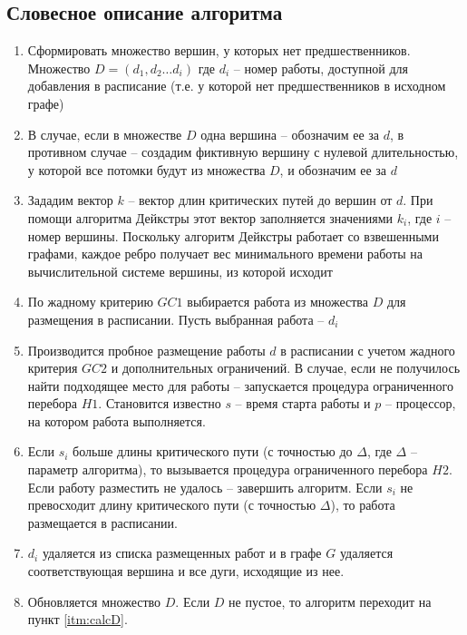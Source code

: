 \subsection{Словесное описание алгоритма}
\begin{enumerate}
    \item Сформировать множество вершин, у которых нет предшественников. Множество $D = \left( d_1, d_2 \dots d_i \right)$ где $d_i$ – номер работы, доступной для добавления в расписание (т.е. у которой нет предшественников в исходном графе)
    \item В случае, если в множестве $D$ одна вершина – обозначим ее за $d$, в противном случае – создадим фиктивную вершину с нулевой длительностью, у которой все потомки будут из множества $D$, и обозначим ее за $d$
    \begin{figure}[H]
    \end{figure}
    \item Зададим вектор $k$ – вектор длин критических путей до вершин от $d$. При помощи алгоритма Дейкстры этот вектор заполняется значениями $k_i$, где $i$ – номер вершины. Поскольку алгоритм Дейкстры работает со взвешенными графами, каждое ребро получает вес минимального времени работы на вычислительной системе вершины, из которой исходит
    \item \label{itm:calcD} По жадному критерию $GC1$ выбирается работа из множества $D$ для размещения в расписании. Пусть выбранная работа – $d_i$
    \begin{figure}[H]
    \end{figure}
    \item Производится пробное размещение работы $d$ в расписании с учетом жадного критерия $GC2$ и дополнительных ограничений. В случае, если не получилось найти подходящее место для работы – запускается процедура ограниченного перебора $H1$. Становится известно $s$ – время старта работы и $p$ – процессор, на котором работа выполняется.
    \item Если $s_i$ больше длины критического пути (с точностью до $\Delta$, где $\Delta$ – параметр алгоритма), то вызывается процедура ограниченного перебора $H2$. Если работу разместить не удалось – завершить алгоритм. Если $s_i$ не превосходит длину критического пути (с точностью $\Delta$), то работа размещается в расписании.
    \item $d_i$ удаляется из списка размещенных работ и в графе $G$ удаляется соответствующая вершина и все дуги, исходящие из нее.
    \item Обновляется множество $D$. Если $D$ не пустое, то алгоритм переходит на пункт \ref{itm:calcD}.
\end{enumerate}
